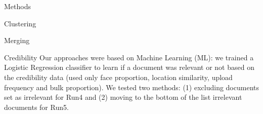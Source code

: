 \documentclass{acm_proc_article-me}
\begin{document}
\begin{section}{Methods}
\begin{subsection}{Clustering}
\begin{subsubsection}{Merging}



\end{subsubsection}

\end{subsection}

\begin{subsection}{Credibility}
Our approaches were based on Machine Learning (ML): we trained a Logistic Regression classifier to learn if a document was relevant or not based on the credibility data (used only face proportion, location similarity, upload frequency and bulk proportion).
We tested two methods: (1) excluding documents set as irrelevant for Run4 and (2) moving to the bottom of the list irrelevant documents for Run5.

\end{subsection}
\end{section}
\end{document}
